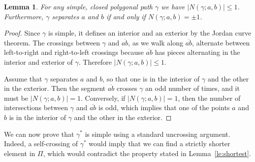 \documentclass[11pt,a4paper]{article}
\newtheorem{lemma}[definition]{Lemma}
\newcommand\segment[1]{\ensuremath{\overline{#1}}}
\begin{document}
\begin{lemma}\label{le:jordan}
	For any simple, closed polygonal path $\gamma$ we have $|N(\gamma;a,b)|\le 1$.
	Furthermore, $\gamma$ separates $a$ and $b$ if and only if $N(\gamma;a,b)= \pm 1$.
\end{lemma}
\begin{proof} 
	Since $\gamma$ is simple, it defines an interior and an exterior by the Jordan curve theorem.
	The crossings between $\gamma$ and $\segment{ab}$, as we walk along $\segment{ab}$,
	alternate between left-to-right and right-to-left crossings because $\segment{ab}$ has
	pieces alternating in the interior and exterior of $\gamma$.
	Therefore $|N(\gamma;a,b)|\le 1$.
	
	Assume that $\gamma$ separates $a$ and $b$, so that one is in the interior of $\gamma$
	and the other in the exterior.
	Then the segment $\segment{ab}$ crosses $\gamma$ an odd number of times, and it must be 
	$|N(\gamma;a,b)|=1$. Conversely, if $|N(\gamma;a,b)|=1$, then the number of intersections between
	$\gamma$ and $\segment{ab}$ is odd, which implies that one of the points $a$ and $b$ is in the interior
	of $\gamma$ and the other in the exterior.
\end{proof}

We can now prove that $\gamma^*$ is simple using a standard uncrossing argument.
Indeed, a self-crossing of $\gamma^*$ would imply that we can find a strictly 
shorter element in $\Pi$, which would contradict the property stated in Lemma~\ref{le:shortest}.
\end{document}
